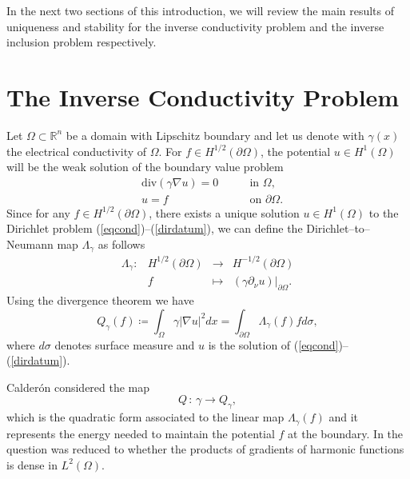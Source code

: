 \documentclass[10pt, a4paper, twoside, openright]{book}
\theoremstyle{definition}
\theoremstyle{plain}
\theoremstyle{plain}
\theoremstyle{plain}
\theoremstyle{plain}
\theoremstyle{plain}
\theoremstyle{plain}
\theoremstyle{plain}
\theoremstyle{plain}
\begin{document}
In the next two sections of this introduction, we will review the main results of uniqueness and stability
for the inverse conductivity problem and the inverse inclusion problem respectively.


\section{The Inverse Conductivity Problem}
\label{globuniq}
Let $\Omega\subset\mathbb{R}^{n}$ be a domain with Lipschitz boundary and let
us denote with $\gamma(x)$ the electrical conductivity of $\Omega$.
For $f\in H^{1/2}(\partial\Omega)$,
the potential $u\in H^{1}(\Omega)$ will be the weak
solution of the boundary value problem
\begin{eqnarray}
\label{eqcond}  
&\mathrm{div}(\gamma\nabla u)=0\qquad&\textrm{in }\Omega,\\
\label{dirdatum}
&u=f\qquad&\textrm{on }\partial\Omega.
\end{eqnarray}
Since for any $f\in H^{1/2}(\partial\Omega)$, there exists a unique solution $u\in H^{1}(\Omega)$
to the Dirichlet problem (\ref{eqcond})--(\ref{dirdatum}),
we can define the Dirichlet--to--Neumann map $\Lambda_{\gamma}$ as follows
\begin{equation}
\label{dirtoneum}
\begin{array}{crcl}
\Lambda_{\gamma}:&H^{1/2}(\partial\Omega)&\longrightarrow&H^{-1/2}(\partial\Omega)\\
&f&\longmapsto&\left(\gamma\partial_\nu u\right)|_{\partial\Omega}.
\end{array}
\end{equation}
Using the divergence theorem we have
\begin{equation}
\label{Qmap}
Q_{\gamma}(f)\coloneqq\int_{\Omega}\gamma|\nabla u|^{2}dx
=\int_{\partial\Omega}\Lambda_\gamma(f)fd\sigma,
\end{equation}
where $d\sigma$ denotes surface measure and $u$ is the solution
of (\ref{eqcond})--(\ref{dirdatum}).

Calder\'on considered the map
\begin{equation}
\label{Q}
Q\,:\,\gamma\longrightarrow Q_{\gamma},
\end{equation}
which is the quadratic form associated to the linear map
$\Lambda_{\gamma}(f)$ and it represents
the energy needed to maintain the potential
$f$ at the boundary.
In \cite{Ca} the question was reduced to whether the products of gradients
of harmonic functions is dense in $L^{2}(\Omega)$.
\end{document}
